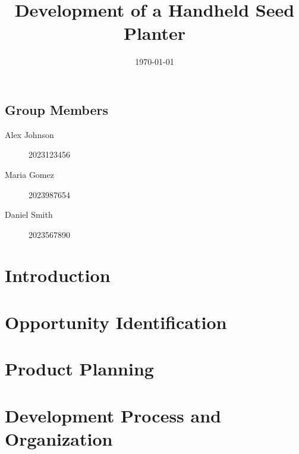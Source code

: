 \documentclass[a4paper,12pt]{report} %
\begin{document}
\title{ Development of a Handheld Seed Planter}

\date{\today}
\maketitle

\section*{Group Members}
\begin{description}
    \item[Alex Johnson] \hfill 2023123456
    \item[Maria Gomez] \hfill 2023987654
    \item[Daniel Smith] \hfill 2023567890
\end{description}


\chapter{Introduction}


\chapter{Opportunity Identification}


\chapter{Product Planning}


\chapter{Development Process and Organization}




% 
\end{document}
